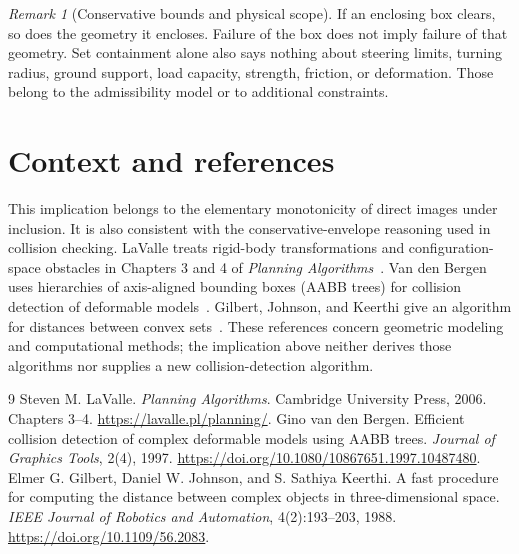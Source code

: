 \documentclass[11pt,a4paper]{article}
\theoremstyle{definition}
\theoremstyle{remark}
\newtheorem{remark}{Remark}
\begin{document}
\begin{remark}[Conservative bounds and physical scope]
If an enclosing box clears, so does the geometry it encloses. Failure of the box does not imply failure of that geometry. Set containment alone also says nothing about steering limits, turning radius, ground support, load capacity, strength, friction, or deformation. Those belong to the admissibility model or to additional constraints.
\end{remark}

\section{Context and references}
This implication belongs to the elementary monotonicity of direct images under inclusion. It is also consistent with the conservative-envelope reasoning used in collision checking. LaValle treats rigid-body transformations and configuration-space obstacles in Chapters 3 and 4 of \emph{Planning Algorithms}~\cite{lavalle}. Van den Bergen uses hierarchies of axis-aligned bounding boxes (AABB trees) for collision detection of deformable models~\cite{bergen}. Gilbert, Johnson, and Keerthi give an algorithm for distances between convex sets~\cite{gjk}. These references concern geometric modeling and computational methods; the implication above neither derives those algorithms nor supplies a new collision-detection algorithm.

\begin{thebibliography}{9}
 Steven M. LaValle. \emph{Planning Algorithms}. Cambridge University Press, 2006. Chapters 3--4. \url{https://lavalle.pl/planning/}.
 Gino van den Bergen. Efficient collision detection of complex deformable models using AABB trees. \emph{Journal of Graphics Tools}, 2(4), 1997. \url{https://doi.org/10.1080/10867651.1997.10487480}.
 Elmer G. Gilbert, Daniel W. Johnson, and S. Sathiya Keerthi. A fast procedure for computing the distance between complex objects in three-dimensional space. \emph{IEEE Journal of Robotics and Automation}, 4(2):193--203, 1988. \url{https://doi.org/10.1109/56.2083}.
\end{thebibliography}
\end{document}
